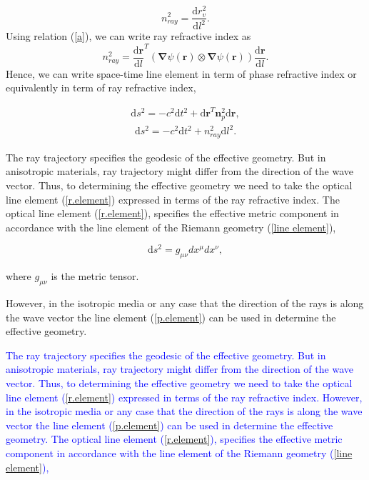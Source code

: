 \documentclass[9pt,twocolumn,twoside]{osajnl}
\begin{document}
\begin{equation}\label{ray-refractive}
n^{2}_{ray}=\dfrac{{\mathrm{d}{r^{2}_{v}}}}{{\mathrm{d}{l}^{2}}}.
\end{equation} 
Using relation (\ref{a}), we can write ray refractive index as 
\begin{equation}\label{r.refractive}
n^{2}_{ray}={\dfrac{\mathrm{d}{\mathbf{r}}}{\mathrm{d}{l}}}^{T}\left(\boldsymbol{\nabla}{\psi(\mathbf{r})}\otimes\boldsymbol{\nabla}{\psi(\mathbf{r})}\right)\dfrac{\mathrm{d}{\mathbf{r}}}{\mathrm{d}{l}}.
\end{equation}
Hence, we can write space-time line element in term of phase refractive index or equivalently in term of ray refractive index,

\begin{align}
\mathrm{d}s^{2}=-c^{2}\mathrm{d}{t}^{2}+{\mathrm{d}{\mathbf{r}}}^{T}\mathbf{n}^{2}_{p}\mathbf{\mathrm{d}{r}},\label{p.element}
\end{align}
\begin{align}
\mathrm{d}s^{2}=-c^{2}\mathrm{d}{t}^{2}+n^{2}_{ray}\mathrm{d}{l}^{2}.
\label{r.element}
\end{align}

The ray trajectory specifies the geodesic of the effective geometry.  But in anisotropic materials, ray trajectory might differ from the direction of the wave vector.  Thus, to determining the effective geometry we need to take the optical line element (\ref{r.element}) expressed in terms of the ray refractive index.
 The optical line element (\ref{r.element}), specifies the effective metric component in accordance  with the line element of the Riemann geometry (\ref{line element}), 
 
\begin{equation}\label{line element}
\mathrm{d}s^{2}=g_{\mu\nu}dx^{\mu}dx^{\nu},
\end{equation}

where $ g_{\mu\nu} $ is the metric tensor. 

However,  in the isotropic media  or any case that the direction of the rays is along the wave vector the line element (\ref{p.element}) can be used in determine the effective geometry.

\textcolor{blue}{ The ray trajectory specifies the geodesic of the effective geometry.  But in anisotropic materials, ray trajectory might differ from the direction of the wave vector.  Thus, to determining the effective geometry we need to take the optical line element (\ref{r.element}) expressed in terms of the ray refractive index. However,  in the isotropic media  or any case that the direction of the rays is along the wave vector the line element (\ref{p.element}) can be used in determine the effective geometry. The optical line element (\ref{r.element}), specifies the effective metric component in accordance  with the line element of the Riemann geometry (\ref{line element}), }
 
\end{document}
